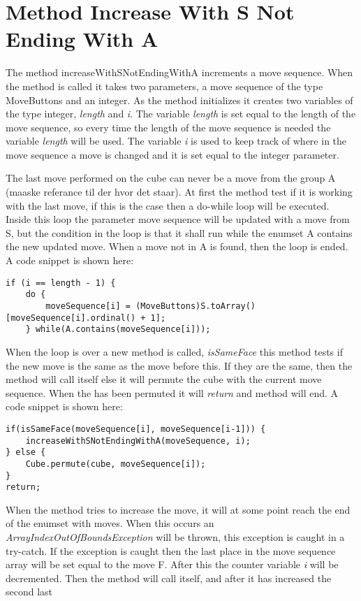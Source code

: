 \section{Method Increase With S Not Ending With A}

The method increaseWithSNotEndingWithA increments a move sequence.
When the method is called it takes two parameters, a move sequence of the type MoveButtons and an integer.
As the method initializes it creates two variables of the type integer, \textit{length} and \textit{i}.
The variable \textit{length} is set equal to the length of the move sequence, so every time the length of the move sequence is needed the variable \textit{length} will be used.
The variable \textit{i} is used to keep track of where in the move sequence a move is changed and it is set equal to the integer parameter. 

The last move performed on the cube can never be a move from the group A (maaske referance til der hvor det staar).
At first the method test if it is working with the last move, if this is the case then a do-while loop will be executed.
Inside this loop the parameter move sequence will be updated with a move from S, but the condition in the loop is that it shall run while the enumset A contains the new updated move.
When a move not in A is found, then the loop is ended.
A code snippet is shown here:

\begin{verbatim}
if (i == length - 1) {
	do {
		moveSequence[i] = (MoveButtons)S.toArray()[moveSequence[i].ordinal() + 1];
	} while(A.contains(moveSequence[i]));
\end{verbatim}

When the loop is over a new method is called, \textit{isSameFace} this method tests if the new move is the same as the move before this.
If they are the same, then the method will call itself else it will permute the cube with the current move sequence.
When the \rubik{} has been permuted it will \textit{return} and method will end.
A code snippet is shown here:

\begin{verbatim}
if(isSameFace(moveSequence[i], moveSequence[i-1])) {
	increaseWithSNotEndingWithA(moveSequence, i);
} else {
	Cube.permute(cube, moveSequence[i]);
}
return;
\end{verbatim}

When the method tries to increase the move, it will at some point reach the end of the enumset with moves.
When this occurs an \textit{ArrayIndexOutOfBoundsException} will be thrown, this exception is caught in a try-catch.
If the exception is caught then the last place in the move sequence array will be set equal to the move F.
After this the counter variable \textit{i} will be decremented.
Then the method will call itself, and after it has increased the second last

